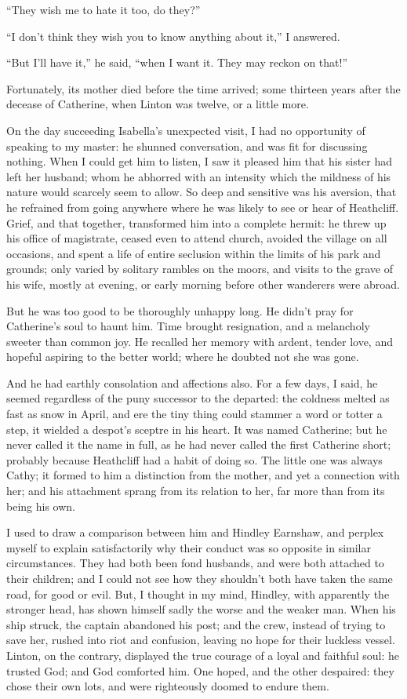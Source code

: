 \par “They wish me to hate it too, do they?”
\par “I don't think they wish you to know anything about it,” I answered.
\par “But I'll have it,” he said, “when I want it. They may reckon on that!”
\par Fortunately, its mother died before the time arrived; some thirteen years after the decease of Catherine, when Linton was twelve, or a little more.
\par On the day succeeding Isabella's unexpected visit, I had no opportunity of speaking to my master: he shunned conversation, and was fit for discussing nothing. When I could get him to listen, I saw it pleased him that his sister had left her husband; whom he abhorred with an intensity which the mildness of his nature would scarcely seem to allow. So deep and sensitive was his aversion, that he refrained from going anywhere where he was likely to see or hear of Heathcliff. Grief, and that together, transformed him into a complete hermit: he threw up his office of magistrate, ceased even to attend church, avoided the village on all occasions, and spent a life of entire seclusion within the limits of his park and grounds; only varied by solitary rambles on the moors, and visits to the grave of his wife, mostly at evening, or early morning before other wanderers were abroad.
\par But he was too good to be thoroughly unhappy long. He didn't pray for Catherine's soul to haunt him. Time brought resignation, and a melancholy sweeter than common joy. He recalled her memory with ardent, tender love, and hopeful aspiring to the better world; where he doubted not she was gone.
\par And he had earthly consolation and affections also. For a few days, I said, he seemed regardless of the puny successor to the departed: the coldness melted as fast as snow in April, and ere the tiny thing could stammer a word or totter a step, it wielded a despot's sceptre in his heart. It was named Catherine; but he never called it the name in full, as he had never called the first Catherine short; probably because Heathcliff had a habit of doing so. The little one was always Cathy; it formed to him a distinction from the mother, and yet a connection with her; and his attachment sprang from its relation to her, far more than from its being his own.
\par I used to draw a comparison between him and Hindley Earnshaw, and perplex myself to explain satisfactorily why their conduct was so opposite in similar circumstances. They had both been fond husbands, and were both attached to their children; and I could not see how they shouldn't both have taken the same road, for good or evil. But, I thought in my mind, Hindley, with apparently the stronger head, has shown himself sadly the worse and the weaker man. When his ship struck, the captain abandoned his post; and the crew, instead of trying to save her, rushed into riot and confusion, leaving no hope for their luckless vessel. Linton, on the contrary, displayed the true courage of a loyal and faithful soul: he trusted God; and God comforted him. One hoped, and the other despaired: they chose their own lots, and were righteously doomed to endure them.
